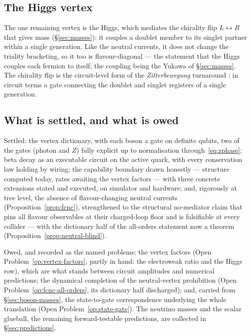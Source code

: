 \subsection{The Higgs vertex}

The one remaining vertex is the Higgs, which mediates the chirality flip $L\leftrightarrow R$ that
gives mass (\S\ref{sec:masses}): it couples a doublet member to its singlet partner within a single
generation. Like the neutral currents, it does not change the triality bracketing, so it too is
flavour-diagonal --- the statement that the Higgs couples each fermion to itself, the coupling being
the Yukawa of \S\ref{sec:masses}. The chirality flip is the circuit-level form of the
\emph{Zitterbewegung} turnaround \autocite[628--632]{Penrose1994}: in circuit terms a gate connecting the doublet and singlet
registers of a single generation.

\subsection{What is settled, and what is owed}

Settled: the vertex dictionary, with each boson a gate on definite qubits, two of the gates
(photon and $Z$) fully explicit up to normalisation through~\eqref{eq:zphase}; beta decay as an
executable circuit on the active quark, with every conservation law holding by wiring; the
capability boundary drawn honestly --- structure computed today, rates awaiting the vertex factors
--- with three concrete extensions stated and executed, on simulator and hardware; and, rigorously at tree level, the absence
of flavour-changing neutral currents (Proposition~\ref{prop:fcnc}), strengthened to the structural
no-mediator claim that pins all flavour observables at their charged-loop floor and is falsifiable
at every collider --- with the dictionary half of the all-orders statement now a theorem
(Proposition~\ref{prop:neutral-blind}).

Owed, and recorded as the named problems: the vertex factors (Open Problem~\ref{op:vertex-factors},
partly in hand: the electroweak ratio and the Higgs row), which are what stands between circuit
amplitudes and numerical predictions; the dynamical completion of the neutral-vertex prohibition
(Open Problem~\ref{op:fcnc-all-orders}, its dictionary half discharged); and, carried from \S\ref{sec:boson-masses}, the
state-to-gate correspondence underlying the whole translation
(Open Problem~\ref{op:state-gate}). The neutrino masses and the scalar glueball, the remaining
forward-testable predictions, are collected in \S\ref{sec:predictions}.

